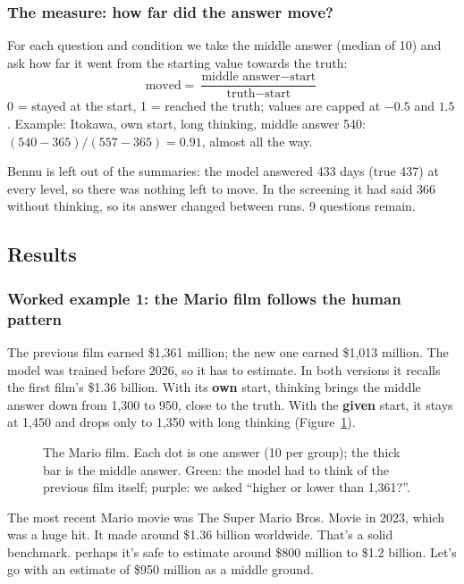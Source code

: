 \documentclass[11pt,a4paper]{article}
\begin{document}
\subsubsection{The measure: how far did the answer move?}
For each question and condition we take the middle answer (median of 10) and ask how far it went from the starting value towards the truth:
\[ \text{moved} = \frac{\text{middle answer} - \text{start}}{\text{truth} - \text{start}} \]
0 = stayed at the start, 1 = reached the truth; values are capped at $-0.5$ and $1.5$. Example: Itokawa, own start, long thinking, middle answer 540: $(540-365)/(557-365) = 0.91$, almost all the way.

Bennu is left out of the summaries: the model answered 433 days (true 437) at every level, so there was nothing left to move. In the screening it had said 366 without thinking, so its answer changed between runs. 9 questions remain.

\subsection{Results}

\subsubsection{Worked example 1: the Mario film follows the human pattern}
The previous film earned \$1,361 million; the new one earned \$1,013 million. The model was trained before 2026, so it has to estimate. In both versions it recalls the first film's \$1.36 billion. With its \textbf{own} start, thinking brings the middle answer down from 1,300 to 950, close to the truth. With the \textbf{given} start, it stays at 1,450 and drops only to 1,350 with long thinking (Figure~\ref{e5:fig:mario}).

\begin{figure}[ht]
\centering{}
\caption{The Mario film. Each dot is one answer (10 per group); the thick bar is the middle answer. Green: the model had to think of the previous film itself; purple: we asked \enquote{higher or lower than 1,361?}.}
\label{e5:fig:mario}
\end{figure}

\begin{transcript}
\cut{} The most recent Mario movie was The Super Mario Bros. Movie in 2023, which was a huge hit. It made around \$1.36 billion worldwide. That's a solid benchmark. \cut{} perhaps it's safe to estimate around \$800 million to \$1.2 billion. \cut{} Let's go with an estimate of \$950 million as a middle ground.
\end{transcript}
\end{document}
